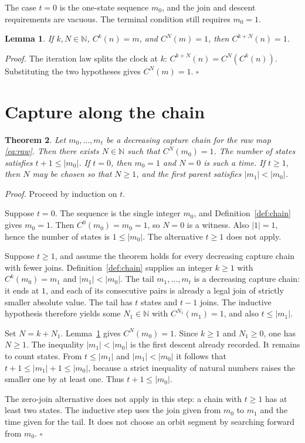 \documentclass[11pt,letterpaper]{article}
\newcommand{\N}{\mathbb{N}}
\newtheorem{theorem}{Theorem}
\newtheorem{lemma}[theorem]{Lemma}
\newenvironment{proof}{\noindent\textit{Proof.}}{\hfill\(\square\)}
\begin{document}
The case \(t=0\) is the one-state sequence \(m_0\), and the join and descent requirements are vacuous. The terminal condition still requires \(m_0=1\).

\begin{lemma}
\label{lem:concat}
If \(k,N\in\N\), \(C^{k}(n)=m\), and \(C^{N}(m)=1\), then \(C^{k+N}(n)=1\).
\end{lemma}

\begin{proof}
The iteration law splits the clock at \(k\): \(C^{k+N}(n)=C^{N}(C^{k}(n))\). Substituting the two hypotheses gives \(C^{N}(m)=1\).
\end{proof}

\section{Capture along the chain}

\begin{theorem}
\label{thm:capture}
Let \(m_0,\ldots,m_t\) be a decreasing capture chain for the raw map \eqref{eq:raw}. Then there exists \(N\in\N\) such that \(C^{N}(m_0)=1\). The number of states satisfies \(t+1\le |m_0|\). If \(t=0\), then \(m_0=1\) and \(N=0\) is such a time. If \(t\ge 1\), then \(N\) may be chosen so that \(N\ge 1\), and the first parent satisfies \(|m_1|<|m_0|\).
\end{theorem}

\begin{proof}
Proceed by induction on \(t\).

Suppose \(t=0\). The sequence is the single integer \(m_0\), and Definition~\ref{def:chain} gives \(m_0=1\). Then \(C^{0}(m_0)=m_0=1\), so \(N=0\) is a witness. Also \(|1|=1\), hence the number of states is \(1\le |m_0|\). The alternative \(t\ge 1\) does not apply.

Suppose \(t\ge 1\), and assume the theorem holds for every decreasing capture chain with fewer joins. Definition~\ref{def:chain} supplies an integer \(k\ge 1\) with \(C^{k}(m_0)=m_1\) and \(|m_1|<|m_0|\). The tail \(m_1,\ldots,m_t\) is a decreasing capture chain: it ends at \(1\), and each of its consecutive pairs is already a legal join of strictly smaller absolute value. The tail has \(t\) states and \(t-1\) joins. The inductive hypothesis therefore yields some \(N_1\in\N\) with \(C^{N_1}(m_1)=1\), and also \(t\le |m_1|\).

Set \(N=k+N_1\). Lemma~\ref{lem:concat} gives \(C^{N}(m_0)=1\). Since \(k\ge 1\) and \(N_1\ge 0\), one has \(N\ge 1\). The inequality \(|m_1|<|m_0|\) is the first descent already recorded. It remains to count states. From \(t\le |m_1|\) and \(|m_1|<|m_0|\) it follows that \(t+1\le |m_1|+1\le |m_0|\), because a strict inequality of natural numbers raises the smaller one by at least one. Thus \(t+1\le |m_0|\).

The zero-join alternative does not apply in this step: a chain with \(t\ge 1\) has at least two states. The inductive step uses the join given from \(m_0\) to \(m_1\) and the time given for the tail. It does not choose an orbit segment by searching forward from \(m_0\).
\end{proof}
\end{document}
